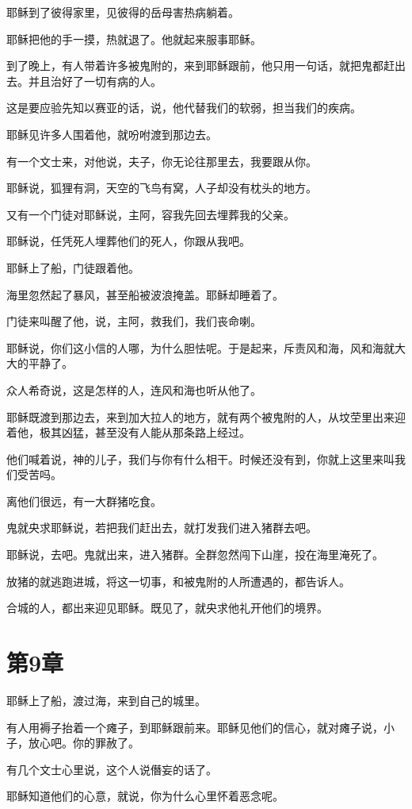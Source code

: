 \documentclass[12pt,oneside]{book}
\begin{document}
耶稣到了彼得家里，见彼得的岳母害热病躺着。

耶稣把他的手一摸，热就退了。他就起来服事耶稣。

到了晚上，有人带着许多被鬼附的，来到耶稣跟前，他只用一句话，就把鬼都赶出去。并且治好了一切有病的人。

这是要应验先知以赛亚的话，说，他代替我们的软弱，担当我们的疾病。

耶稣见许多人围着他，就吩咐渡到那边去。

有一个文士来，对他说，夫子，你无论往那里去，我要跟从你。

耶稣说，狐狸有洞，天空的飞鸟有窝，人子却没有枕头的地方。

又有一个门徒对耶稣说，主阿，容我先回去埋葬我的父亲。

耶稣说，任凭死人埋葬他们的死人，你跟从我吧。

耶稣上了船，门徒跟着他。

海里忽然起了暴风，甚至船被波浪掩盖。耶稣却睡着了。

门徒来叫醒了他，说，主阿，救我们，我们丧命喇。

耶稣说，你们这小信的人哪，为什么胆怯呢。于是起来，斥责风和海，风和海就大大的平静了。

众人希奇说，这是怎样的人，连风和海也听从他了。

耶稣既渡到那边去，来到加大拉人的地方，就有两个被鬼附的人，从坟茔里出来迎着他，极其凶猛，甚至没有人能从那条路上经过。

他们喊着说，神的儿子，我们与你有什么相干。时候还没有到，你就上这里来叫我们受苦吗。

离他们很远，有一大群猪吃食。

鬼就央求耶稣说，若把我们赶出去，就打发我们进入猪群去吧。

耶稣说，去吧。鬼就出来，进入猪群。全群忽然闯下山崖，投在海里淹死了。

放猪的就逃跑进城，将这一切事，和被鬼附的人所遭遇的，都告诉人。

合城的人，都出来迎见耶稣。既见了，就央求他礼开他们的境界。

\chapter{第9章}
耶稣上了船，渡过海，来到自己的城里。

有人用褥子抬着一个瘫子，到耶稣跟前来。耶稣见他们的信心，就对瘫子说，小子，放心吧。你的罪赦了。

有几个文士心里说，这个人说僭妄的话了。

耶稣知道他们的心意，就说，你为什么心里怀着恶念呢。
\end{document}
